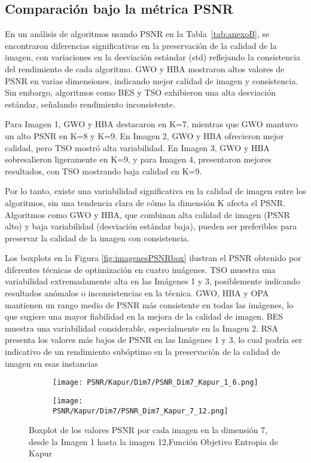 \documentclass[conference]{IEEEtran}
\begin{document}
\subsection{Comparación bajo la métrica PSNR}
\noindent En un análisis de algoritmos usando PSNR en la Tabla~\ref{tab:anexoB}, se encontraron diferencias significativas en la preservación de la calidad de la imagen, con variaciones en la desviación estándar (std) reflejando la consistencia del rendimiento de cada algoritmo. GWO y HBA mostraron altos valores de PSNR en varias dimensiones, indicando mejor calidad de imagen y consistencia. Sin embargo, algoritmos como BES y TSO exhibieron una alta desviación estándar, señalando rendimiento inconsistente.

\noindent Para Imagen 1, GWO y HBA destacaron en K=7, mientras que GWO mantuvo un alto PSNR en K=8 y K=9. En Imagen 2, GWO y HBA ofrecieron mejor calidad, pero TSO mostró alta variabilidad. En Imagen 3, GWO y HBA sobresalieron ligeramente en K=9, y para Imagen 4, presentaron mejores resultados, con TSO mostrando baja calidad en K=9.

\noindent Por lo tanto, existe una variabilidad significativa en la calidad de imagen entre los algoritmos, sin una tendencia clara de cómo la dimensión K afecta el PSNR. Algoritmos como GWO y HBA, que combinan alta calidad de imagen (PSNR alto) y baja variabilidad (desviación estándar baja), pueden ser preferibles para preservar la calidad de la imagen con consistencia.

\noindent Los boxplots en la Figura \ref{fig:imagenesPSNRbox} ilustran el PSNR obtenido por diferentes técnicas de optimización en cuatro imágenes. TSO muestra una variabilidad extremadamente alta en las Imágenes 1 y 3, posiblemente indicando resultados anómalos o inconsistencias en la técnica. GWO, HBA y OPA mantienen un rango medio de PSNR más consistente en todas las imágenes, lo que sugiere una mayor fiabilidad en la mejora de la calidad de imagen. BES muestra una variabilidad considerable, especialmente en la Imagen 2. RSA presenta los valores más bajos de PSNR en las Imágenes 1 y 3, lo cual podría ser indicativo de un rendimiento subóptimo en la preservación de la calidad de imagen en esas instancias

\begin{figure}[htbp]
	\centering
	
	\begin{subfigure}{0.5\textwidth}
		\texttt{[image: PSNR/Kapur/Dim7/PSNR\_Dim7\_Kapur\_1\_6.png]}
	\end{subfigure}
	
	\begin{subfigure}{0.5\textwidth}
		\texttt{[image: PSNR/Kapur/Dim7/PSNR\_Dim7\_Kapur\_7\_12.png]}
	\end{subfigure}
	\caption{Boxplot de los valores PSNR por cada imagen en la dimensión 7, desde la Imagen 1 hasta la imagen 12,Función Objetivo Entropia de Kapur}
	\label{fig:imagenes}    
\end{figure}
\end{document}
